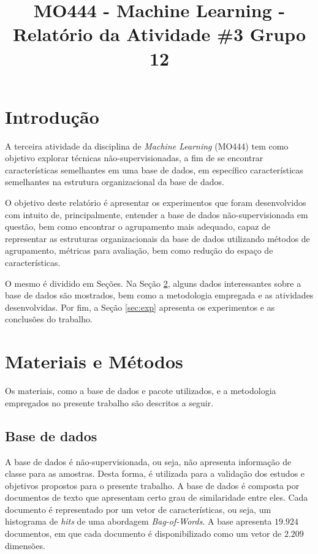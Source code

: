 \documentclass[conference]{IEEEtran}
\begin{document}
\title{MO444 - Machine Learning - Relatório da Atividade \#3 Grupo 12}

\author{
\and
{}
}

\maketitle

\section{Introdução}

A terceira atividade da disciplina de \textit{Machine Learning} (MO444) tem como objetivo explorar técnicas não-supervisionadas, a fim de se encontrar características semelhantes em uma base de dados, em específico características semelhantes na estrutura organizacional da base de dados.

O objetivo deste relatório é apresentar os experimentos que foram desenvolvidos com intuito de, principalmente, entender a base de dados não-supervisionada em questão, bem como encontrar o agrupamento mais adequado, capaz de representar as estruturas organizacionais da base de dados utilizando métodos de agrupamento, métricas para avaliação, bem como redução do espaço de características.

O mesmo é dividido em Seções. Na Seção \ref{sec:meto}, alguns dados interessantes sobre a base de dados são mostrados, bem como a metodologia empregada e as atividades desenvolvidas. Por fim, a Seção \ref{sec:exp} apresenta os experimentos e as conclusões do trabalho.

\section{Materiais e Métodos} \label{sec:meto}

Os materiais, como a base de dados e pacote utilizados, e a metodologia empregados no presente trabalho são descritos a seguir.

\subsection{Base de dados} \label{sec:base}

A base de dados é não-supervisionada, ou seja, não apresenta informação de classe para as amostras. Desta forma, é utilizada para a validação dos estudos e objetivos propostos para o presente trabalho. A base de dados é composta por documentos de texto que apresentam certo grau de similaridade entre eles. Cada documento é representado por um vetor de características, ou seja, um histograma de \emph{hits} de uma abordagem \emph{Bag-of-Words}. A base apresenta $19.924$ documentos, em que cada documento é disponibilizado como um vetor de $2.209$ dimensões.
\end{document}
